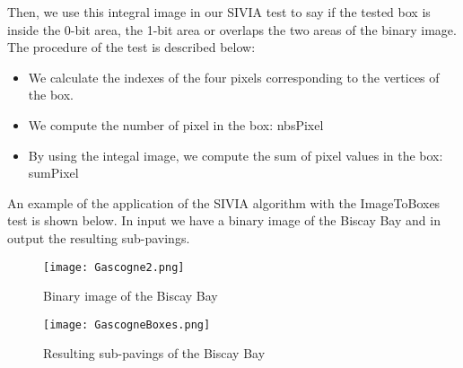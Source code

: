 Then, we use this integral image in our SIVIA test to say if the tested box is inside the 0-bit area, the 1-bit area or overlaps the two areas of the binary image. The procedure of the test is described below:
\begin{itemize}
\item We calculate the indexes of the four pixels corresponding to the vertices of the box.
\item We compute the number of pixel in the box: nbsPixel
\item By using the integal image, we compute the sum of pixel values in the box: sumPixel 
\end{itemize}
\vspace{1cm}
An example of the application of the SIVIA algorithm with the ImageToBoxes test is shown below. In input we have a binary image of the Biscay Bay and in output the resulting sub-pavings.
\begin{figure}[H]
\centering
    \begin{minipage}[b]{0.4\textwidth}
    \texttt{[image: Gascogne2.png]}
	\caption{Binary image of the Biscay Bay } 
	\label{fig: Biscay Bay}
    \end{minipage}
    \begin{minipage}[b]{0.4\textwidth}
    \texttt{[image: GascogneBoxes.png]} 
	\caption{Resulting sub-pavings of the Biscay Bay } 
	\label{fig: Sub-pavings of the Biscay Bay}
    \end{minipage}
\end{figure}

